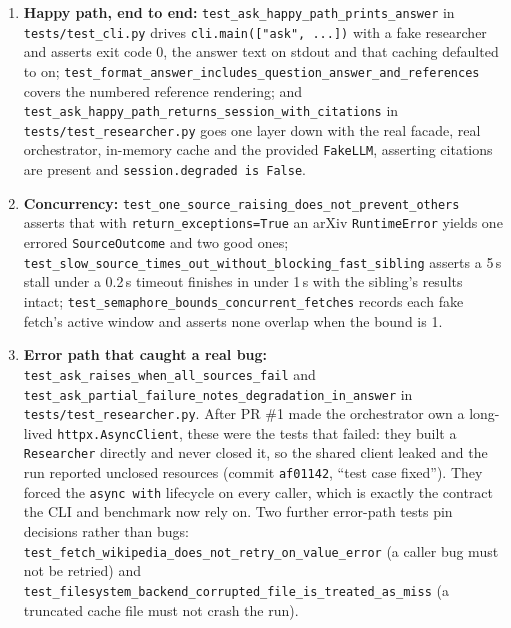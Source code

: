 \documentclass[11pt,a4paper]{article}
\begin{document}
\begin{enumerate}[leftmargin=1.6em,itemsep=2pt]
  \item \textbf{Happy path, end to end:} \texttt{test\_ask\_happy\_path\_prints\_answer} in \texttt{tests/test\_cli.py} drives \texttt{cli.main(["ask", ...])} with a fake researcher and asserts exit code 0, the answer text on stdout and that caching defaulted to on; \texttt{test\_format\_answer\_includes\_question\_answer\_and\_references} covers the numbered reference rendering; and \texttt{test\_ask\_happy\_path\_returns\_session\_with\_citations} in \texttt{tests/test\_researcher.py} goes one layer down with the real facade, real orchestrator, in-memory cache and the provided \texttt{FakeLLM}, asserting citations are present and \texttt{session.degraded is False}.
  \item \textbf{Concurrency:} \texttt{test\_one\_source\_raising\_does\_not\_prevent\_others} asserts that with \texttt{return\_exceptions=True} an arXiv \texttt{RuntimeError} yields one errored \texttt{SourceOutcome} and two good ones; \texttt{test\_slow\_source\_times\_out\_without\_blocking\_fast\_sibling} asserts a 5\,s stall under a 0.2\,s timeout finishes in under 1\,s with the sibling's results intact; \texttt{test\_semaphore\_bounds\_concurrent\_fetches} records each fake fetch's active window and asserts none overlap when the bound is 1.
  \item \textbf{Error path that caught a real bug:} \texttt{test\_ask\_raises\_when\_all\_sources\_fail} and \texttt{test\_ask\_partial\_failure\_notes\_degradation\_in\_answer} in \texttt{tests/test\_researcher.py}. After PR \#1 made the orchestrator own a long-lived \texttt{httpx.AsyncClient}, these were the tests that failed: they built a \texttt{Researcher} directly and never closed it, so the shared client leaked and the run reported unclosed resources (commit \texttt{af01142}, ``test case fixed''). They forced the \texttt{async with} lifecycle on every caller, which is exactly the contract the CLI and benchmark now rely on. Two further error-path tests pin decisions rather than bugs: \texttt{test\_fetch\_wikipedia\_does\_not\_retry\_on\_value\_error} (a caller bug must not be retried) and \texttt{test\_filesystem\_backend\_corrupted\_file\_is\_treated\_as\_miss} (a truncated cache file must not crash the run).
\end{enumerate}
\end{document}
